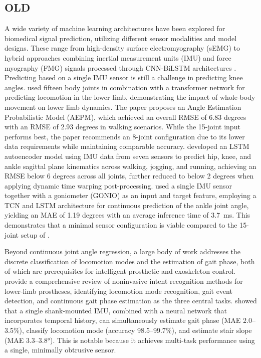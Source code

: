 \subsection{OLD}
A wide variety of machine learning architectures have been explored for biomedical signal prediction, utilizing different sensor modalities and model designs. These range from high-density surface electromyography (sEMG) \citep{10752377} to hybrid approaches combining inertial measurement units (IMU) and force myography (FMG) signals processed through CNN-BiLSTM architectures \citep{wangEnhancingLocomotionModeRecognition2025}. Predicting based on a single IMU sensor is still a challenge in predicting knee angles. \citet{wangGaitSeamlessKnee2025} used fifteen body joints in combination with a transformer network for predicting locomotion in the lower limb, demonstrating the impact of whole-body movement on lower limb dynamics. The paper proposes an Angle Estimation Probabilistic Model (AEPM), which achieved an overall RMSE of 6.83 degrees with an RMSE of 2.93 degrees in walking scenarios. While the 15-joint input performs best, the paper recommends an 8-joint configuration due to its lower data requirements while maintaining comparable accuracy. \citet{shahGaitSpeedTask2025} developed an LSTM autoencoder model using IMU data from seven sensors to predict hip, knee, and ankle sagittal plane kinematics across walking, jogging, and running, achieving an RMSE below 6 degrees across all joints, further reduced to below 2 degrees when applying dynamic time warping post-processing. \citet{thudor2025knee} used a single IMU sensor together with a goniometer (GONIO) as an input and target feature, employing a TCN and LSTM architecture for continuous prediction of the ankle joint angle, yielding an MAE of 1.19 degrees with an average inference time of 3.7~ms. This demonstrates that a minimal sensor configuration is viable compared to the 15-joint setup of \citet{wangGaitSeamlessKnee2025}.

Beyond continuous joint angle regression, a large body of work addresses the discrete classification of locomotion modes and the estimation of gait phase, both of which are prerequisites for intelligent prosthetic and exoskeleton control. \citet{xuNoninvasiveHumanProsthesisInterfaces2021} provide a comprehensive review of noninvasive intent recognition methods for lower-limb prostheses, identifying locomotion mode recognition, gait event detection, and continuous gait phase estimation as the three central tasks. \citet{weigandContinuousLocomotionMode2022} showed that a single shank-mounted IMU, combined with a neural network that incorporates temporal history, can simultaneously estimate gait phase (MAE 2.0--3.5\%), classify locomotion mode (accuracy 98.5--99.7\%), and estimate stair slope (MAE 3.3--3.8°). This is notable because it achieves multi-task performance using a single, minimally obtrusive sensor.

